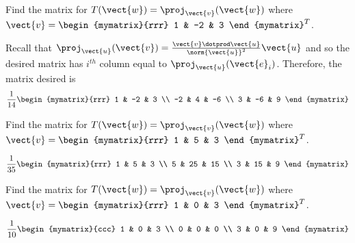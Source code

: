 \begin{enumialphparenastyle}
\begin{ex}  Find the matrix for $T(\vect{w}) = \proj_{\vect{v}}(\vect{w}) $
where $\vect{v}=\begin{mymatrix}{rrr}
1 & -2 & 3
\end{mymatrix} ^{T}$.
\begin{sol}
 Recall that $\proj_{\vect{u}}(\vect{v}) =\frac{\vect{v}\dotprod\vect{u} }{\norm{\vect{u}} ^{2}}\vect{u}$ and so the desired matrix
has $i^{th}$ column equal to $\proj_{\vect{u}}(\vect{e}_{i})$. Therefore, the matrix desired is
\[
\frac{1}{14}\begin{mymatrix}{rrr}
1 & -2 & 3 \\
-2 & 4 & -6 \\
3 & -6 & 9
\end{mymatrix}
\]
\end{sol}
\end{ex}

\begin{ex}  Find the matrix for $T(\vect{w}) = \proj_{\vect{v}}(\vect{w}) $
where $\vect{v}=\begin{mymatrix}{rrr}
1 & 5 & 3
\end{mymatrix} ^{T}$.
\begin{sol}
\[
\frac{1}{35}\begin{mymatrix}{rrr}
1 & 5 & 3 \\
5 & 25 & 15 \\
3 & 15 & 9
\end{mymatrix}
\]
\end{sol}
\end{ex}

\begin{ex} Find the matrix for $T(\vect{w}) = \proj_{\vect{v}}(\vect{w}) $
where $\vect{v}=\begin{mymatrix}{rrr}
1 & 0 & 3
\end{mymatrix} ^{T}$. 
\begin{sol}
\[
\frac{1}{10}\begin{mymatrix}{ccc}
1 & 0 & 3 \\
0 & 0 & 0 \\
3 & 0 & 9
\end{mymatrix}
\]
\end{sol}
\end{ex}


\end{enumialphparenastyle}
